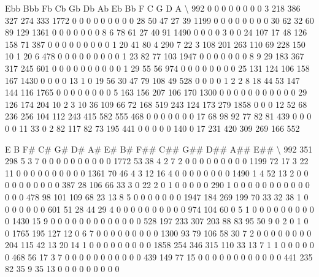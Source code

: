 \documentclass[letterpaper,10pt,english]{sphinxmanual}
\begin{document}
{\begin{sphinxVerbatim}[commandchars=\\\{\}]
      Ebb  Bbb  Fb   Cb   Gb   Db   Ab   Eb   Bb    F    C    G    D    A  \textbackslash{}
992     0    0   0    0    0    0    0    0    3  218  386  327  274  333
1772    0    0   0    0    0    0    0    0    0   28   50   47   27   39
1199    0    0   0    0    0    0    0    0   30   62   32   60   89  129
1361    0    0   0    0    0    0    0    8    6   78   61   27   40   91
1490    0    0   0    0    3    0    0   24  107   17   48  126  158   71
387     0    0   0    0    0    0    0    0    0    1   20   41   80    4
290     7   22   3  108  201  263  110   69  228  150   10    1   20    6
478     0    0   0    0    0    0    0    0    0    1   23   82   77  103
1947    0    0   0    0    0    0    0    8    9   29  183  367  317  245
601     0    0   0    0    0    0    0    0    0    0    1   29   55   56
974     0    0   0    0    0    0    0    0   25  131  124  106  158  167
1430    0    0   0    0   13    1    0   19   56   30   47   79  108   49
528     0    0   0    0    1    2    2    8   18   44   53  147  144  116
1765    0    0   0    0    0    0    0    0    5  163  156  207  106  170
1300    0    0   0    0    0    0    0    0    0    0    0   29  126  174
204    10    2   3   10   36  109   66   72  168  519  243  124  173  279
1858    0    0   0   12   52   68  236  256  104  112  243  415  582  555
468     0    0   0    0    0    0    0   17   68   98   92   77   82   81
439     0    0   0    0    0   11   33    0    2   82  117   82   73  195
441     0    0   0    0    0  140    0   17  231  420  309  269  166  552

        E    B   F\#   C\#  G\#  D\#  A\#  E\#  B\#  F\#\#  C\#\#  G\#\#  D\#\#  A\#\#  E\#\#  \textbackslash{}
992   351  298    5    3   7   0   0   0   0    0    0    0    0    0    0
1772   53   38    4    2   7   2   0   0   0    0    0    0    0    0    0
1199   72   17    3   22  11   0   0   0   0    0    0    0    0    0    0
1361   70   46    4    3  12  16   4   0   0    0    0    0    0    0    0
1490    1    4   52   13   2   0   0   0   0    0    0    0    0    0    0
387    28  106   66   33   3   0  22   2   0    1    0    0    0    0    0
290     1    0    0    0   0   0   0   0   0    0    0    0    0    0    0
478    98  101  109   68  23  13   8   5   0    0    0    0    0    0    0
1947  184  269  199   70  33  32  38   1   0    0    0    0    0    0    0
601    51   28   44   29   4   0   0   0   0    0    0    0    0    0    0
974   104   60    0    5   1   0   0   0   0    0    0    0    0    0    0
1430   15    9    0    0   0   0   0   0   0    0    0    0    0    0    0
528   197  233  307  203  88  83  95  50   9    0    2    0    1    0    0
1765  195  127   12    0   6   7   0   0   0    0    0    0    0    0    0
1300   93   79  106   58  30   7   2   0   0    0    0    0    0    0    0
204   115   42   13   20  14   1   0   0   0    0    0    0    0    0    0
1858  254  346  315  110  33  13   7   1   1    0    0    0    0    0    0
468    56   17    3    7   0   0   0   0   0    0    0    0    0    0    0
439   149   77   15    0   0   0   0   0   0    0    0    0    0    0    0
441   235   82   35    9  35  13   0   0   0    0    0    0    0    0    0


\end{sphinxVerbatim}}
\end{document}
